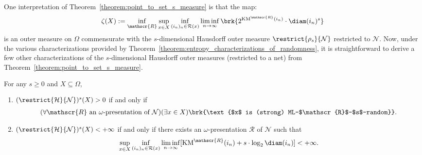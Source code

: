 One interpretation of Theorem~\ref{theorem:point_to_set_s_measure} is that the map:
\begin{align*}
    \zeta(X) := \inf_{\mathscr{R}} \sup_{x \in X} \inf_{(i_n)_n \in \mathcal{R}(x)} \liminf_{n \to \infty} \brk{2^{\operatorname{KM}^{\mathscr{R}}(i_n)} \cdot \diam(i_n)^s}
\end{align*}
is an outer measure on $\Omega$ commensurate with the $s$-dimensional Hausdorff outer measure $\restrict{\rho_s}{\mathcal{N}}$ restricted to $\mathcal{N}$. Now, under the various characterizations provided by Theorem~\ref{theorem:entropy_characterizations_of_randomness}, it is straightforward to derive a few other characterizations of the $s$-dimensional Hausdorff outer measures (restricted to a net) from Theorem~\ref{theorem:point_to_set_s_measure}.

\begin{corollary}
    \label{corollary:point_to_set_non_null_and_finite}
    For any $s \geq 0$ and $X \subseteq \Omega$,
    \begin{enumerate}[label=(\roman*)]
        \item $(\restrict{\mathcal{H}}{\mathcal{N}})^s(X) > 0$ if and only if
            \begin{align*}
                (\forall \mathscr{R} \text{ an $\omega$-presentation of $\mathcal{N}$})(\exists x \in X) \brk{\text{$x$ 
 is (strong) ML-$\mathscr{R}$-$s$-random}}.
            \end{align*}
        \item $(\restrict{\mathcal{H}}{\mathcal{N}})^s(X) < +\infty$ if and only if there exists an $\omega$-presentation $\mathscr{R}$ of $\mathcal{N}$ such that
            \begin{align*}
                \sup_{x \in X} \inf_{(i_n)_n \in \mathcal{R}(x)} \liminf_{n \to \infty} [\operatorname{KM}^{\mathscr{R}}(i_n) + s \cdot \log_2 \diam(i_n)] < +\infty.
            \end{align*}
    \end{enumerate}
\end{corollary}

